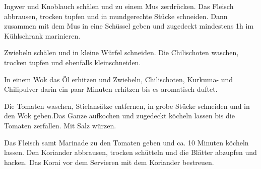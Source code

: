 \vspace*{\fill}
\begin{multicols}{2}

Ingwer und Knoblauch schälen und zu einem Mus zerdrücken.
Das Fleisch abbrausen, trocken tupfen und in mundgerechte Stücke schneiden.
Dann zusammen mit dem Mus in eine Schüssel geben und zugedeckt mindestens 1h im
Kühlschrank marinieren.\newline

Zwiebeln schälen und in kleine Würfel schneiden. Die Chilischoten waschen, trocken tupfen
und ebenfalls kleinschneiden.\newline

In einem Wok das Öl erhitzen und Zwiebeln, Chilischoten, Kurkuma- und Chilipulver darin ein
paar Minuten erhitzen bis es aromatisch duftet.\newline

Die Tomaten waschen, Stielansätze entfernen, in grobe Stücke schneiden und in den Wok 
geben.\newline Das Ganze aufkochen und zugedeckt köcheln lassen bis die Tomaten zerfallen.
Mit Salz würzen.\newline

Das Fleisch samt Marinade zu den Tomaten geben und ca. 10 Minuten köcheln lassen.\newline
Den Koriander abbrausen, trocken schütteln und die Blätter abzupfen und hacken.
Das Korai vor dem Servieren mit dem Koriander bestreuen. 



\end{multicols}
\vfill
